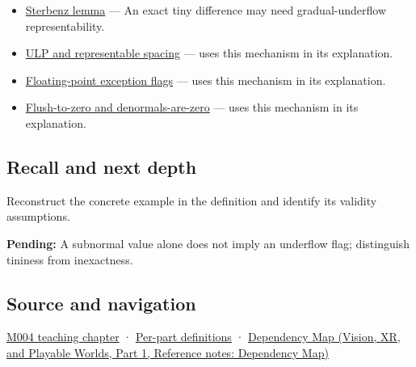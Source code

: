\hypertarget{appendix-00a6e044c437-used-by}{}

\begin{itemize}
\item
  \hyperref[appendix-399b7ad53f39]{Sterbenz lemma} --- An exact tiny difference may need gradual-underflow representability.
\item
  \hyperref[appendix-14bab4cab9d4]{ULP and representable spacing} --- uses this mechanism in its explanation.
\item
  \hyperref[appendix-ed8531b46754]{Floating-point exception flags} --- uses this mechanism in its explanation.
\item
  \hyperref[appendix-e979eb012782]{Flush-to-zero and denormals-are-zero} --- uses this mechanism in its explanation.
\end{itemize}

\subsection{Recall and next depth}\label{appendix-00a6e044c437-recall-and-next-depth}

\hypertarget{appendix-00a6e044c437-recall-and-next-depth}{}

Reconstruct the concrete example in the definition and identify its validity assumptions.

\textbf{Pending:} A subnormal value alone does not imply an underflow flag; distinguish tininess from inexactness.

\subsection{Source and navigation}\label{appendix-00a6e044c437-source-and-navigation}

\hypertarget{appendix-00a6e044c437-source-and-navigation}{}

\hyperref[01-foundations-i-ch001-a-stretching-ruler-for-real-valued-quantities]{M004 teaching chapter} · \hyperref[appendix-fd090d982a15-m004---parts-61-76]{Per-part definitions} · \href{../07-Vision-XR-and-Playable-Worlds-P01/main.pdf\#nameddest=appendix-4ad47bdd269a}{Dependency Map (Vision, XR, and Playable Worlds, Part 1, Reference notes: Dependency Map)}
